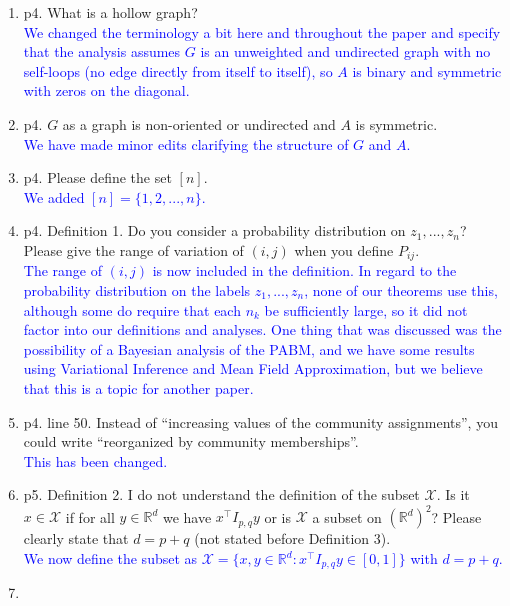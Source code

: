 \documentclass[
]{article}
\begin{document}
\begin{enumerate}
\def\labelenumi{\arabic{enumi}.}
\item
  p4. What is a hollow graph?\\
  \textcolor{blue}{
  We changed the terminology a bit here and throughout the paper 
  and specify that the analysis assumes $G$ is an unweighted and undirected graph with no self-loops (no edge directly from itself to itself), 
  so $A$ is binary and symmetric with zeros on the diagonal. 
  }
\item
  p4. \(G\) as a graph is non-oriented or undirected and \(A\) is
  symmetric.\\
  \textcolor{blue}{
  We have made minor edits clarifying the structure of $G$ and $A$. 
  }
\item
  p4. Please define the set \([n]\).\\
  \textcolor{blue}{
  We added $[n] = \{1, 2, ..., n\}$. 
  }
\item
  p4. Definition 1. Do you consider a probability distribution on
  \(z_1, ..., z_n\)? Please give the range of variation of \((i, j)\)
  when you define \(P_{ij}\).\\
  \textcolor{blue}{
  The range of $(i, j)$ is now included in the definition. 
  In regard to the probability distribution on the labels $z_1, ..., z_n$, none of our theorems use this, although some do require that each $n_k$ be sufficiently large, so it did not factor into our definitions and analyses. 
  One thing that was discussed was the possibility of a Bayesian analysis of the PABM, and we have some results using Variational Inference and Mean Field Approximation, but we believe that this is a topic for another paper. 
  }
\item
  p4. line 50. Instead of ``increasing values of the community
  assignments'', you could write ``reorganized by community
  memberships''.\\
  \textcolor{blue}{
  This has been changed.
  }
\item
  p5. Definition 2. I do not understand the definition of the subset
  \(\mathcal{X}\). Is it \(x \in \mathcal{X}\) if for all
  \(y \in \mathbb{R}^d\) we have \(x^\top I_{p,q} y\) or is
  \(\mathcal{X}\) a subset on \((\mathbb{R}^d)^2\)? Please clearly state
  that \(d = p + q\) (not stated before Definition 3).\\
  \textcolor{blue}{
  We now define the subset as $\mathcal{X} = \{x, y \in \mathbb{R}^d : x^\top I_{p, q} y \in [0, 1]\}$ with $d = p + q$. 
  }
\item

\end{enumerate}
\end{document}
